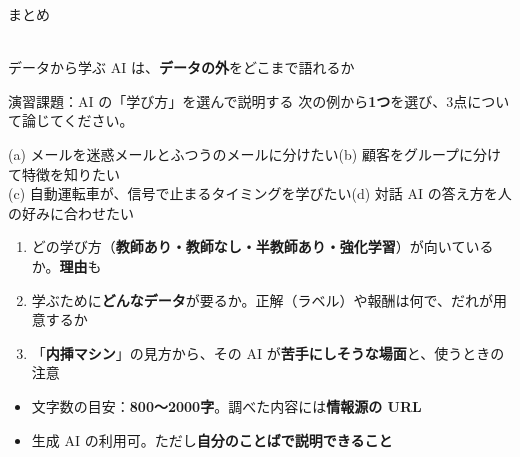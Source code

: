 \documentclass[aspectratio=169]{beamer}
\begin{document}
\begin{frame}{まとめ}
\begin{center}
\\[0.8em]
{\large データから学ぶ AI は、\textbf{データの外}をどこまで語れるか}
\end{center}
\end{frame}

\begin{frame}{演習課題：AI の「学び方」を選んで説明する}
次の例から\textbf{1つ}を選び、3点について論じてください。\\[0.2em]
{\small (a) メールを迷惑メールとふつうのメールに分けたい\quad (b) 顧客をグループに分けて特徴を知りたい\\
(c) 自動運転車が、信号で止まるタイミングを学びたい\quad (d) 対話 AI の答え方を人の好みに合わせたい\par}
\begin{enumerate}\small
  \item どの学び方（\textbf{教師あり・教師なし・半教師あり・強化学習}）が向いているか。\textbf{理由}も
  \item 学ぶために\textbf{どんなデータ}が要るか。正解（ラベル）や報酬は何で、だれが用意するか
  \item 「\textbf{内挿マシン}」の見方から、その AI が\textbf{苦手にしそうな場面}と、使うときの注意
\end{enumerate}
\vspace{0.1em}
\begin{itemize}\small
  \item 文字数の目安：\textbf{800〜2000字}。調べた内容には\textbf{情報源の URL}
  \item 生成 AI の利用可。ただし\textbf{自分のことばで説明できること}
\end{itemize}
\end{frame}
\end{document}
